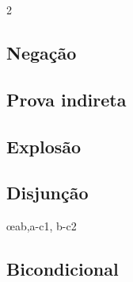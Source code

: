 \begin{multicols}{2}
\subsection*{Negação}

\begin{fitchproof}
\open
	\AS
\close
{}
\end{fitchproof}
\begin{fitchproof}
\end{fitchproof}

\subsection*{Prova indireta}

\begin{fitchproof}
\open
	\AS
\close
{}
\end{fitchproof}


\subsection*{Explosão}

\begin{fitchproof}
\end{fitchproof}

\subsection*{Disjunção}

\begin{fitchproof}
\end{fitchproof}
\begin{fitchproof}
\end{fitchproof}
\begin{fitchproof}
	\open
		\AS
	\close
	\open
		\AS
	\close
	 \oe{ab,a-c1, b-c2}
\end{fitchproof}

\subsection*{Bicondicional}


\end{multicols}
